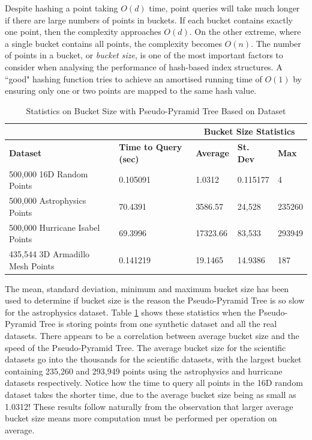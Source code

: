 Despite hashing a point taking $O(d)$ time, point queries will take much longer if there are large numbers of points in buckets. If each bucket contains exactly one point, then the complexity approaches $O(d)$. On the other extreme, where a single bucket contains all points, the complexity becomes $O(n)$. The number of points in a bucket, or \textit{bucket size}, is one of the most important factors to consider when analysing the performance of hash-based index structures. A ``good" hashing function tries to achieve an amortised running time of $O(1)$ by ensuring only one or two points are mapped to the same hash value.

\begin{table}
	\centering
	\begin{tabular}{|l|l|l|l|l|}
		\hline
		& & \multicolumn{3}{c|}{\textbf{Bucket Size Statistics}} \\
		\hline
		\textbf{Dataset} & \textbf{Time to Query (sec)} & \textbf{Average} & \textbf{St. Dev} & \textbf{Max} \\
		\hline
		500,000 16D Random Points & 0.105091 & 1.0312 & 0.115177 & 4 \\
		500,000 Astrophysics Points & 70.4391 & 3586.57 & 24,528 & 235260 \\
		500,000 Hurricane Isabel Points & 69.3996 & 17323.66 & 83,533 & 293949 \\
		435,544 3D Armadillo Mesh Points & 0.141219 & 19.1465 & 14.9386 & 187 \\
		\hline
	\end{tabular}
	\caption{Statistics on Bucket Size with Pseudo-Pyramid Tree Based on Dataset}
	\label{tab:perf1-bucket-stats}
\end{table}

The mean, standard deviation, minimum and maximum bucket size has been used to determine if bucket size is the reason the Pseudo-Pyramid Tree is so slow for the astrophysics dataset. Table \ref{tab:perf1-bucket-stats} shows these statistics when the Pseudo-Pyramid Tree is storing points from one synthetic dataset and all the real datasets. There appears to be a correlation between average bucket size and the speed of the Pseudo-Pyramid Tree. The average bucket size for the scientific datasets go into the thousands for the scientific datasets, with the largest bucket containing 235,260 and 293,949 points using the astrophysics and hurricane datasets respectively. Notice how the time to query all points in the 16D random dataset takes the shorter time, due to the average bucket size being as small as 1.0312! These results follow naturally from the observation that larger average bucket size means more computation must be performed per operation on average.

